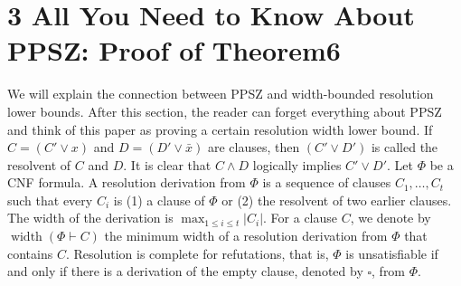 \section*{3 All You Need to Know About PPSZ: Proof of Theorem6}
We will explain the connection between PPSZ and width-bounded resolution lower bounds. After this section, the reader can forget everything about PPSZ and think of this paper as proving a certain resolution width lower bound. If $C=(C'\vee x)$ and $D=(D'\vee\bar x)$ are clauses, then $(C'\vee D')$ is called the resolvent of $C$ and $D$. It is clear that $C\wedge D$ logically implies $C'\vee D'$. Let $\Phi$ be a CNF formula. A resolution derivation from $\Phi$ is a sequence of clauses $C_1,\ldots,C_t$ such that every $C_i$ is (1) a clause of $\Phi$ or (2) the resolvent of two earlier clauses. The width of the derivation is $\max_{1\le i\le t}|C_i|$. For a clause $C$, we denote by $\operatorname{width}(\Phi\vdash C)$ the minimum width of a resolution derivation from $\Phi$ that contains $C$. Resolution is complete for refutations, that is, $\Phi$ is unsatisfiable if and only if there is a derivation of the empty clause, denoted by $\square$, from $\Phi$.

